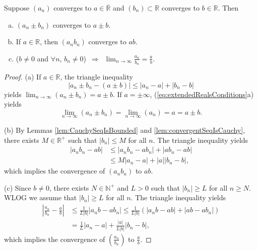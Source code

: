 \begin{thm}
  \label{thm:limitOperation}
  Suppose $(a_{n})$ converges to $a\in \overline{\mathbb{R}}$
  and $(b_{n})\subset \mathbb{R}$ converges to $b\in \mathbb{R}$.
  Then
  \begin{enumerate}[(a)]\itemsep0em
  \item $(a_{n}\pm b_{n})$ converges to $a\pm b$.
  \item If $a\in \mathbb{R}$, then $(a_{n}b_{n})$ converges to $ab$.
  \item ($b\ne 0$ and $\forall n$, $b_{n}\ne 0$)\ $\Rightarrow$\ 
    $\lim_{n\rightarrow \infty}\frac{a_{n}}{b_{n}} = \frac{a}{b}$.
  \end{enumerate}
\end{thm}
\begin{proof}
  (a) If $a\in \mathbb{R}$, the triangle inequality
  \begin{displaymath}
    |a_{n}\pm b_{n}-(a\pm b)|\le |a_{n}-a|+|b_{n}-b|
  \end{displaymath}
  yields $\lim_{n\rightarrow \infty}(a_{n}\pm b_{n})=a\pm b$.
  If $a=\pm\infty$, (\ref{eq:extendedRealsConditions}a) yields 
  \begin{displaymath}
    \lim_{n\rightarrow\infty}(a_{n}\pm b_{n})
    =\lim_{n\rightarrow\infty}(a_{n})=a=a\pm b.
  \end{displaymath}

  (b) By Lemmas \ref{lem:CauchySeqIsBounded}
  and \ref{lem:convergentSeqIsCauchy}, 
  there exists $M\in\mathbb{R}^+$ such that $|b_{n}|\le M$ for all $n$.
  The triangle inequality yields
  \begin{align*}
    |a_{n}b_{n}-ab|
    &\le |a_{n}b_{n}-ab_{n}|+|ab_{n}-ab|\\
    &\le M|a_{n}-a|+|a||b_{n}-b|,
  \end{align*}
  which implies the convergence of $(a_{n}b_{n})$ to $ab$.

  (c) Since $b\ne 0$, there exists $N\in \mathbb{N}^{+}$ and $L>0$
  such that $|b_{n}|\ge L$ for all $n\ge N$. WLOG we assume that
  $|b_{n}|\ge L$ for all $n$. The triangle inequality yields
  \begin{align*}
    \left| \frac{a_{n}}{b_{n}}-\frac{a}{b} \right|
    &\le \frac{1}{L|b|}|a_{n}b-ab_{n}| 
    \le \frac{1}{L|b|}(|a_{n}b-ab|+|ab-ab_{n}|) \\
    &=\frac{1}{L}|a_{n}-a|+\frac{|a|}{L|b|}|b_{n}-b|,
  \end{align*}
  which implies the convergence of $(\frac{a_{n}}{b_{n}})$
  to $\frac{a}{b}$.
\end{proof}


